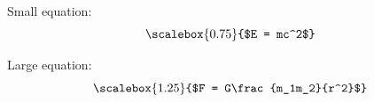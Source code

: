 \begin{PremiumCard}
Small equation:
\[
\scalebox{0.75}{$E = mc^2$}
\]

Large equation:
\[
\scalebox{1.25}{$F = G\frac{m_1m_2}{r^2}$}
\]
\end{PremiumCard}
